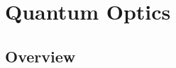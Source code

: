 \renewcommand{\lastmod}{September 18, 2023}
\renewcommand{\chapterauthors}{Markus Lippitz}

\chapter{Quantum Optics}

\section{Overview}



\printbibliography[segment=\therefsegment,heading=subbibliography]
